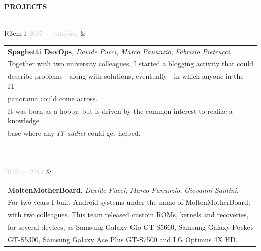 \documentclass{article}
\begin{document}
\textbf{\textcolor{deepblue}{PROJECTS}} \\\\ \hfill
\begin{tabular}{ R{3cm} l }
	\textcolor{lightgray}{2017 — ongoing} &
		\begin{tabular}[l]{@{}l@{}} %
			\textbf{Spaghetti DevOps}, \textit{Davide Pucci}, \textit{Marco Panunzio}, \textit{Fabrizio Pietrucci}. \\
			Together with two university colleagues, I started a blogging activity that could \\
			describe problems - along with solutions, eventually - in which anyone in the IT \\
			panorama could come across. \\
			It was born as a hobby, but is driven by the common interest to realize a knowledge \\
			base where any \textit{IT-addict} could get helped.
		\end{tabular} \\\\ \hfill
	\textcolor{lightgray}{2012 — 2014} &
		\begin{tabular}[l]{@{}l@{}} %
			\textbf{MoltenMotherBoard}, \textit{Davide Pucci}, \textit{Marco Panunzio}, \textit{Giovanni Santini}. \\
			For two years I built Android systems under the name of MoltenMotherBoard,                             \\
			with two colleagues. This team released custom ROMs, kernels and recoveries,                           \\
			for several devices, as Samsung Galaxy Gio GT-S5660, Samsung Galaxy Pocket                             \\
			GT-S5300, Samsung Galaxy Ace Plus GT-S7500 and LG Optimus 4X HD.
		\end{tabular} \\\\ \hfill
\end{tabular}
\end{document}
